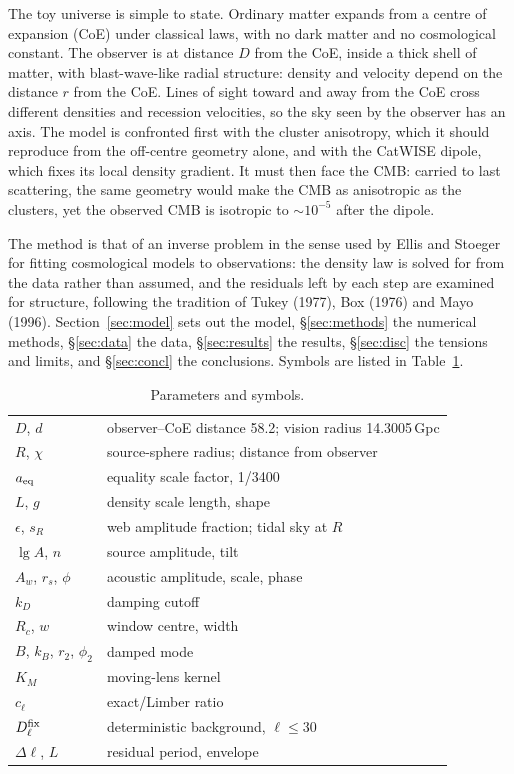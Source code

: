 \documentclass[10pt,twocolumn]{article}
\begin{document}
The toy universe is simple to state. Ordinary matter expands from a centre of expansion (CoE) under classical laws, with no dark matter and no cosmological constant. The observer is at distance $D$ from the CoE, inside a thick shell of matter, with blast-wave-like radial structure: density and velocity depend on the distance $r$ from the CoE. Lines of sight toward and away from the CoE cross different densities and recession velocities, so the sky seen by the observer has an axis. The model is confronted first with the cluster anisotropy, which it should reproduce from the off-centre geometry alone, and with the CatWISE dipole, which fixes its local density gradient. It must then face the CMB: carried to last scattering, the same geometry would make the CMB as anisotropic as the clusters, yet the observed CMB is isotropic to $\sim10^{-5}$ after the dipole.

The method is that of an inverse problem in the sense used by Ellis and Stoeger for fitting cosmological models to observations: the density law is solved for from the data rather than assumed, and the residuals left by each step are examined for structure, following the tradition of Tukey (1977), Box (1976) and Mayo (1996). Section~\ref{sec:model} sets out the model, \S\ref{sec:methods} the numerical methods, \S\ref{sec:data} the data, \S\ref{sec:results} the results, \S\ref{sec:disc} the tensions and limits, and \S\ref{sec:concl} the conclusions. Symbols are listed in Table~\ref{tab:par}.

\begin{table}[tb]\centering\small\caption{Parameters and symbols.}\label{tab:par}\begin{tabular}{@{}p{}p{}@{}}\toprule
$D$, $d$ & observer--CoE distance 58.2; vision radius 14.3005\,Gpc\\
$R$, $\chi$ & source-sphere radius; distance from observer\\
$a_{\rm eq}$ & equality scale factor, 1/3400\\
$L$, $g$ & density scale length, shape\\
$\epsilon$, $s_R$ & web amplitude fraction; tidal sky at $R$\\
$\lg A$, $n$ & source amplitude, tilt\\
$A_w$, $r_s$, $\phi$ & acoustic amplitude, scale, phase\\
$k_D$ & damping cutoff\\
$R_c$, $w$ & window centre, width\\
$B$, $k_B$, $r_2$, $\phi_2$ & damped mode\\
$K_M$ & moving-lens kernel\\
$c_\ell$ & exact/Limber ratio\\
$D^{\rm fix}_\ell$ & deterministic background, $\ell\le30$\\
$\Delta\ell$, $L$ & residual period, envelope\\\bottomrule
\end{tabular}\end{table}
\end{document}
